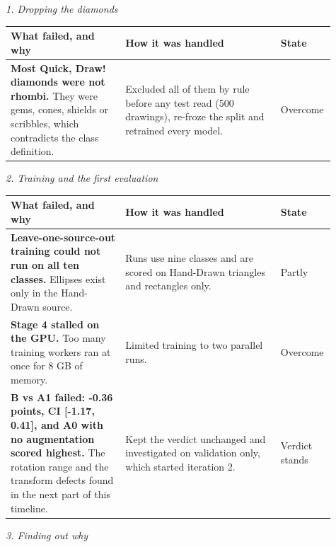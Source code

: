 \textit{1. Dropping the diamonds}

\begin{tabular}{p{0.34\linewidth}p{0.46\linewidth}p{0.11\linewidth}}
\toprule
What failed, and why & How it was handled & State \\
\midrule
\textbf{Most Quick, Draw! diamonds were not rhombi.} They were gems, cones, shields or scribbles, which contradicts the class definition. & Excluded all of them by rule before any test read (500 drawings), re-froze the split and retrained every model. & Overcome \\
\bottomrule
\end{tabular}

\medskip

\textit{2. Training and the first evaluation}

\begin{tabular}{p{0.34\linewidth}p{0.46\linewidth}p{0.11\linewidth}}
\toprule
What failed, and why & How it was handled & State \\
\midrule
\textbf{Leave-one-source-out training could not run on all ten classes.} Ellipses exist only in the Hand-Drawn source. & Runs use nine classes and are scored on Hand-Drawn triangles and rectangles only. & Partly \\
\textbf{Stage 4 stalled on the GPU.} Too many training workers ran at once for 8 GB of memory. & Limited training to two parallel runs. & Overcome \\
\textbf{B vs A1 failed: -0.36 points, CI [-1.17, 0.41], and A0 with no augmentation scored highest.} The rotation range and the transform defects found in the next part of this timeline. & Kept the verdict unchanged and investigated on validation only, which started iteration 2. & Verdict stands \\
\bottomrule
\end{tabular}

\medskip

\textit{3. Finding out why}

